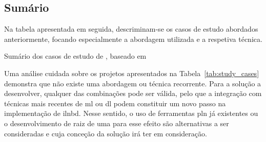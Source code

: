 \subsection{Sumário}
Na tabela apresentada em seguida, descriminam-se os casos de estudo abordados anteriormente, focando especialmente a abordagem utilizada e a respetiva técnica.

\begin{table}[!ht]
\caption{Sumário dos casos de estudo de , baseado em \textcite{survey_nlidb}}
\label{tab:study_cases}
\centering
\resizebox{\textwidth}{!}{}
\end{table}

Uma análise cuidada sobre os projetos apresentados na Tabela~\ref{tab:study_cases} demonstra que não existe uma abordagem ou técnica recorrente. Para a solução a desenvolver, qualquer das combinações pode ser válida, pelo que a integração com técnicas mais recentes de \gls{ml} ou \gls{dl} podem constituir um novo passo na implementação de \gls{ilnbd}. Nesse sentido, o uso de ferramentas \gls{pln} já existentes ou o desenvolvimento de raiz de uma para esse efeito são alternativas a ser consideradas e cuja conceção da solução irá ter em consideração.
